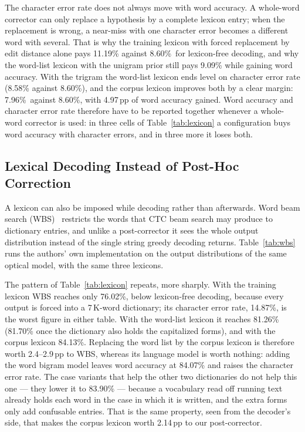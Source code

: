 \documentclass{ws-ijprai}
\newcommand{\ourcer}{7.96\%}
\newcommand{\rawcer}{8.60\%}
\begin{document}
The character error rate does not always move with word accuracy. A
whole-word corrector can only replace a hypothesis by a complete
lexicon entry; when the replacement is wrong, a near-miss with one character
error becomes a different word with several. That is why the training lexicon
with forced replacement by edit distance alone pays 11.19\%
against \rawcer\ for lexicon-free decoding, and why the word-list lexicon
with the unigram prior still pays 9.09\%
while gaining word accuracy. With the trigram the word-list lexicon ends
level on character error rate (8.58\% against \rawcer), and the corpus
lexicon improves both by a clear margin: \ourcer\ against \rawcer, with
4.97\,pp of word accuracy gained. Word accuracy and character error rate
therefore have to be reported together whenever a whole-word corrector is
used: in three cells of Table~\ref{tab:lexicon} a configuration buys word
accuracy with character errors, and in three more it loses both.

\subsection{Lexical Decoding Instead of Post-Hoc Correction}
\label{sec:res-wbs}

A lexicon can also be imposed while decoding rather than afterwards. Word beam
search (WBS)~\cite{scheidl2018wbs} restricts the words that CTC beam search
may produce to dictionary entries, and unlike a post-corrector it sees the whole output distribution
instead of the single string greedy decoding returns. Table~\ref{tab:wbs}
runs the authors' own implementation on the output distributions of the same
optical model, with the same three lexicons.

The pattern of Table~\ref{tab:lexicon} repeats, more sharply. With the
training lexicon WBS reaches only 76.02\%,
below lexicon-free decoding, because every output is forced into a 7\,K-word
dictionary; its character error rate,
14.87\%, is the worst figure in either
table. With the word-list lexicon it reaches
81.26\%
(81.70\% once the
dictionary also holds the capitalized forms), and with the corpus lexicon
84.13\%. Replacing the word list by the corpus lexicon is therefore worth
2.4--2.9\,pp to WBS, whereas its language model is worth nothing: adding
the word bigram model leaves word accuracy at
84.07\% and raises the character
error rate. The case variants that help the other two dictionaries do not
help this one --- they lower it to 83.90\% --- because a vocabulary read off
running text already holds each word in the case in which it is written, and
the extra forms only add confusable entries. That is the same property, seen
from the decoder's side, that makes the corpus lexicon worth 2.14\,pp to our
post-corrector.
\end{document}
